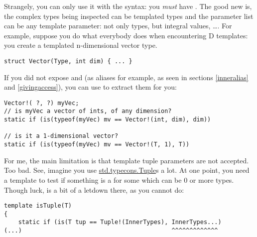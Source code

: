 Strangely, you can only use it with the  syntax: you \emph{must} have . The good new is, the complex types being inspected can be templated types and the parameter list can be any template parameter: not only types, but integral values, \ldots.
For example, suppose you do what everybody does when encountering D templates: you create a templated  n-dimensional vector type.

\begin{verbatim}
struct Vector(Type, int dim) { ... }
\end{verbatim}

If you did not expose  and  (as aliases for example, as seen in sections \ref{inneralias} and \ref{givingaccess}), you can use  to extract them for you:

\begin{verbatim}
Vector!( ?, ?) myVec;
// is myVec a vector of ints, of any dimension?
static if (is(typeof(myVec) mv == Vector!(int, dim), dim))

// is it a 1-dimensional vector?
static if (is(typeof(myVec) mv == Vector!(T, 1), T))
\end{verbatim}



For me, the main limitation is that template tuple parameters are not accepted. Too bad. See, imagine you use \href{www.d-programming-language.org/phobos/std_typecons.html#Tuple}{std.typecons.Tuple}s a lot. At one point, you need a template to test if something is a  for some  which can be 0 or more types. Though luck,  is a bit of a letdown there, as you cannot do:

\begin{verbatim}
template isTuple(T)
{
    static if (is(T tup == Tuple!(InnerTypes), InnerTypes...)
(...)                                          ^^^^^^^^^^^^^
\end{verbatim}

